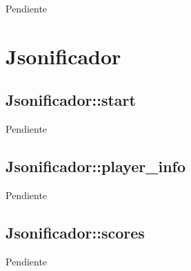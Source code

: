 \documentclass[a4paper,10pt,twoside]{article}
\begin{document}
Pendiente




\section{Jsonificador}


\subsection{Jsonificador::start}

Pendiente


\subsection{Jsonificador::player\_info}

Pendiente


\subsection{Jsonificador::scores}

Pendiente
\end{document}
